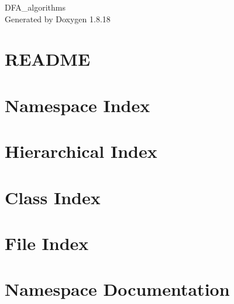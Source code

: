 \let\mypdfximage\pdfximage\def\pdfximage{\immediate\mypdfximage}\documentclass[twoside]{book}
\newcommand{\+}{\discretionary{\mbox{\scriptsize$\hookleftarrow$}}{}{}}
\newcommand{\clearemptydoublepage}{%
  \newpage{\pagestyle{empty}\cleardoublepage}%
}
\begin{document}
\hypersetup{pageanchor=false,
             bookmarksnumbered=true,
             pdfencoding=unicode
            }
\begin{titlepage}
\vspace*{7cm}
\begin{center}%
{\Large D\+F\+A\+\_\+algorithms }\\
\vspace*{1cm}
{\large Generated by Doxygen 1.8.18}\\
\end{center}
\end{titlepage}
\clearemptydoublepage
{}
\tableofcontents
\clearemptydoublepage
{}
\hypersetup{pageanchor=true}

\chapter{R\+E\+A\+D\+ME}
\label{md__r_e_a_d_m_e}

\chapter{Namespace Index}

\chapter{Hierarchical Index}

\chapter{Class Index}

\chapter{File Index}

\chapter{Namespace Documentation}















\end{document}

